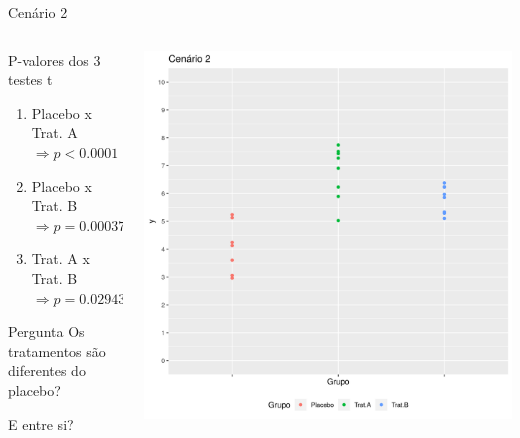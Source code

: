 \documentclass{beamer}
\begin{document}
\begin{frame}[label=cenario2-prob]{\small Cenário 2}
  \begin{columns}
    \begin{column}{5cm}
      \begin{exampleblock}{\footnotesize P-valores dos 3 testes t}
        \tiny
        \begin{enumerate}
        \item Placebo x Trat. A $\Rightarrow p< 0.0001$
        \item Placebo x Trat. B $\Rightarrow p=0.00037$
        \item Trat. A x Trat. B $\Rightarrow p=0.02943$
        \end{enumerate}
      \end{exampleblock}
      \bigskip
      \bigskip
      \begin{exampleblock}{\footnotesize Pergunta}
        \small
        Os tratamentos são diferentes do placebo?

        \bigskip
        E entre si?
      \end{exampleblock}
    \end{column}
    \begin{column}{5cm}
      \includegraphics[width=\textwidth]{Cap13-30/cenario2}
    \end{column}
  \end{columns}
\end{frame}
\end{document}
